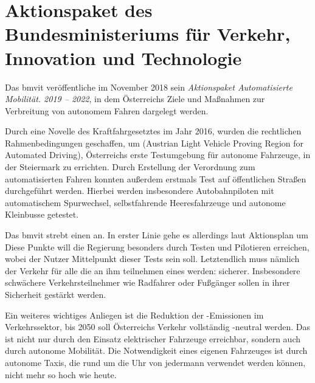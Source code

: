 \section{Aktionspaket des Bundesministeriums für Verkehr, Innovation und Technologie}

Das \ac{bmvit} veröffentliche im November 2018 sein \emph{Aktionspaket Automatisierte Mobilität. 2019 -- 2022}, in dem Österreichs Ziele und Maßnahmen zur Verbreitung von autonomem Fahren dargelegt werden.

Durch eine Novelle des Kraftfahrgesetztes im Jahr 2016, wurden die rechtlichen Rahmenbedingungen geschaffen, um  (Austrian Light Vehicle Proving Region for Automated Driving), Österreichs erste Testumgebung für autonome Fahrzeuge, in der Steiermark zu errichten. Durch Erstellung der Verordnung zum automatisierten Fahren konnten außerdem erstmals Test auf öffentlichen Straßen durchgeführt werden. 
Hierbei werden insbesondere Autobahnpiloten mit automatischem Spurwechsel, selbstfahrende Heeresfahrzeuge und autonome Kleinbusse getestet.

Das \ac{bmvit} strebt einen  an. In erster Linie gehe es allerdings laut Aktionsplan um  Diese Punkte will die Regierung besonders durch Testen und Pilotieren erreichen, wobei der Nutzer Mittelpunkt dieser Tests sein soll. Letztendlich muss nämlich der Verkehr für alle die an ihm teilnehmen eines werden: sicherer. Insbesondere schwächere Verkehrsteilnehmer wie Radfahrer oder Fußgänger sollen in ihrer Sicherheit gestärkt werden.

Ein weiteres wichtiges Anliegen ist die Reduktion der -Emissionen im Verkehrssektor, bis 2050 soll Österreichs Verkehr vollständig -neutral werden. Das ist nicht nur durch den Einsatz elektrischer Fahrzeuge erreichbar, sondern auch durch autonome Mobilität. Die Notwendigkeit eines eigenen Fahrzeuges ist durch autonome Taxis, die rund um die Uhr von jedermann verwendet werden können, nicht mehr so hoch wie heute.
